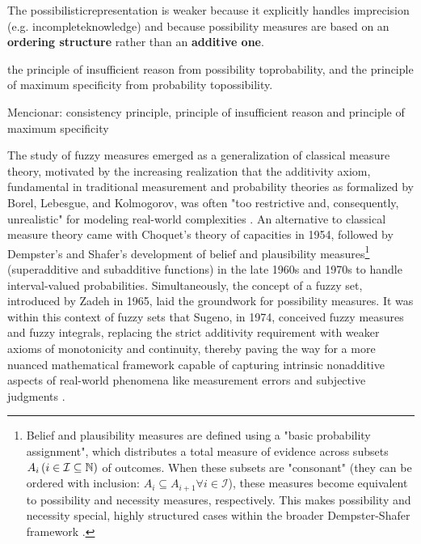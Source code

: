 {The possibilisticrepresentation is weaker because it explicitly handles imprecision (e.g. incompleteknowledge) and because possibility measures are based on an \textbf{ordering structure} rather than an \textbf{additive one}.

the principle of insufficient reason from possibility toprobability, and the principle of maximum specificity from probability topossibility.

Mencionar: consistency principle, principle of insufficient reason and principle of maximum specificity
}








The study of fuzzy measures emerged as a generalization of classical measure theory, motivated by the increasing realization that the additivity axiom, fundamental in traditional measurement and probability theories as formalized by Borel, Lebesgue, and Kolmogorov, was often "too restrictive and, consequently, unrealistic" for modeling real-world complexities \cite[p.~10]{FuzzyMeasureHistory}. An alternative to classical measure theory came with Choquet's theory of capacities in 1954, followed by Dempster's and Shafer's development of belief and plausibility measures\footnote{Belief and plausibility measures are defined using a "basic probability assignment", which distributes a total measure of evidence across subsets $A_i \,(i\in \mathcal{I}\subseteq \mathbb{N})$ of outcomes. When these subsets are "consonant" (they can be ordered with inclusion: $A_i \subseteq  A_{i+1}\forall i\in \mathcal{I}$), these measures become equivalent to possibility and necessity measures, respectively. This makes possibility and necessity special, highly structured cases within the broader Dempster-Shafer framework \cite[Thm.~3.23, Thm.~3.25]{FuzzyMeasureHistory}.} (superadditive and subadditive functions) in the late 1960s and 1970s to handle interval-valued probabilities. Simultaneously, the concept of a fuzzy set, introduced by Zadeh in 1965, laid the groundwork for possibility measures. It was within this context of fuzzy sets that Sugeno, in 1974, conceived fuzzy measures and fuzzy integrals, replacing the strict additivity requirement with weaker axioms of monotonicity and continuity, thereby paving the way for a more nuanced mathematical framework capable of capturing intrinsic nonadditive aspects of real-world phenomena like measurement errors and subjective judgments \cite[p.~13]{FuzzyMeasureHistory}.\\

